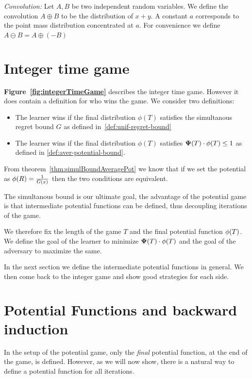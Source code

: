 \documentclass{article}[12pt]
\begin{document}
{\em Convolution:} Let $A,B$ be two independent random variables. We define the
convolution $A \oplus B$ to be the distribution of $x+y$. A constant
$a$ corresponds to the point mass distribution concentrated at
$a$. For convenience we define $A \ominus B = A \oplus (-B)$


\section{Integer time game}
{\bf Figure~\ref{fig:integerTimeGame}} describes the integer time
game. However it does contain a definition for who wins the game. We
consider two definitions:
\begin{itemize}
\item The learner wins if the final distribution $\phi(T)$ satisfies
  the simultanous  regret bound $G$ as defined in~\ref{def:unif-regret-bound}
\item The learner wins if the final distribution $\phi(T)$ satisfies
  ${\bf \Psi}(T) \cdot \phi(T) \leq 1$ as defined in \ref{def:aver-potential-bound}.
\end{itemize}
From theorem~\ref{thm:simulBoundAveragePot} we know that if
we set the potential as $\phi(R) = \frac{1}{G(x)}$ then the two
conditions are equivalent.

The simultanous bound is our ultimate goal, the advantage of the
potential game is that intermediate potential functions can be
defined, thus decoupling iterations of the game.

We therefore fix the length of the game $T$
and the final potential function $\phi(T)$. We define the goal of the
learner to minimize  ${\bf \Psi}(T) \cdot \phi(T)$ and the goal of the
adversary to maximize the same. 

In the next section we define the intermediate potential functions in
general. We then come back to the integer game and show good
strategies for each side.

\section{Potential Functions and backward induction}

 \newcommand{\potPQ}{\pot_{\learnerM,\adversM}}

 In the setup of the potential game, only the {\em final} potential
 function, at the end of the game, is defined. However, as we will now
 show, there is a natural way to define a potential function for all
 iterations.
\end{document}

